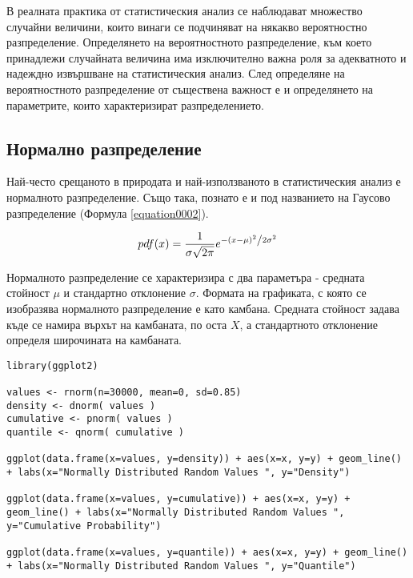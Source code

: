 В реалната практика от статистическия анализ се наблюдават множество случайни величини, които винаги се подчиняват на някакво вероятностно разпределение. Определянето на вероятностното разпределение, към което принадлежи случайната величина има изключително важна роля за адекватното и надеждно извършване на статистическия анализ. След определяне на вероятностното разпределение от съществена важност е и определянето на параметрите, които характеризират разпределението.  

\subsection{Нормално разпределение}

Най-често срещаното в природата и най-използваното в статистическия анализ е нормалното разпределение. Също така, познато е и под названието на Гаусово разпределение (Формула \ref{equation0002}). 

\begin{equation}
pdf(x) = \frac{1}{{\sigma \sqrt {2\pi } }}e^{{{ - \left( {x - \mu } \right)^2 } \mathord{\left/ {\vphantom {{ - \left( {x - \mu } \right)^2 } {2\sigma ^2 }}} \right. \kern-\nulldelimiterspace} {2\sigma ^2 }}}
\label{equation0002}
\end{equation}

Нормалното разпределение се характеризира с два параметъра - средната стойност $\mu$ и стандартно отклонение $\sigma$. Формата на графиката, с която се изобразява нормалното разпределение е като камбана. Средната стойност задава къде се намира върхът на камбаната, по оста $X$, а стандартното отклонение определя широчината на камбаната. 

\begin{lstlisting}[caption=Нормално разпределение, label=listing0157]
library(ggplot2)

values <- rnorm(n=30000, mean=0, sd=0.85)
density <- dnorm( values )
cumulative <- pnorm( values )
quantile <- qnorm( cumulative )

ggplot(data.frame(x=values, y=density)) + aes(x=x, y=y) + geom_line() + labs(x="Normally Distributed Random Values ", y="Density")

ggplot(data.frame(x=values, y=cumulative)) + aes(x=x, y=y) + geom_line() + labs(x="Normally Distributed Random Values ", y="Cumulative Probability")

ggplot(data.frame(x=values, y=quantile)) + aes(x=x, y=y) + geom_line() + labs(x="Normally Distributed Random Values ", y="Quantile")
\end{lstlisting}

